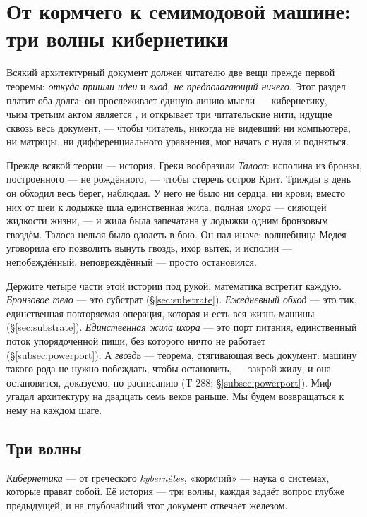 \section{От кормчего к семимодовой машине: три волны кибернетики}
\label{sec:genesis}

Всякий архитектурный документ должен читателю две вещи прежде первой теоремы:
\emph{откуда пришли идеи} и \emph{вход, не предполагающий ничего}. Этот раздел
платит оба долга: он прослеживает единую линию мысли --- кибернетику, --- чьим
третьим актом является \TALOS{}, и открывает три читательские нити, идущие
сквозь весь документ, --- чтобы читатель, никогда не видевший ни компьютера,
ни матрицы, ни дифференциального уравнения, мог начать с нуля и подняться.

\begin{mythbox}
Прежде всякой теории --- история. Греки вообразили \emph{Талоса}: исполина из
бронзы, построенного --- не рождённого, --- чтобы стеречь остров Крит. Трижды
в день он обходил весь берег, наблюдая. У него не было ни сердца, ни крови;
вместо них от шеи к лодыжке шла единственная жила, полная \emph{ихора} ---
сияющей жидкости жизни, --- и жила была запечатана у лодыжки одним бронзовым
гвоздём. Талоса нельзя было одолеть в бою. Он пал иначе: волшебница Медея
уговорила его позволить вынуть гвоздь, ихор вытек, и исполин ---
непобеждённый, неповреждённый --- просто остановился.

Держите четыре части этой истории под рукой; математика встретит каждую.
\emph{Бронзовое тело} --- это субстрат (\S\ref{sec:substrate}).
\emph{Ежедневный обход} --- это тик, единственная повторяемая операция,
которая и есть вся жизнь машины (\S\ref{sec:substrate}). \emph{Единственная
жила ихора} --- это порт питания, единственный поток упорядоченной пищи, без
которого ничто не работает (\S\ref{subsec:powerport}). А \emph{гвоздь} ---
теорема, стягивающая весь документ: машину такого рода не нужно побеждать,
чтобы остановить, --- закрой жилу, и она остановится, доказуемо, по расписанию
(T-288; \S\ref{subsec:powerport}). Миф угадал архитектуру на двадцать семь
веков раньше. Мы будем возвращаться к нему на каждом шаге.
\end{mythbox}

\subsection{Три волны}
\label{subsec:waves}

\emph{Кибернетика} --- от греческого \emph{kybern\'etes}, «кормчий» --- наука
о системах, которые правят собой. Её история --- три волны, каждая задаёт
вопрос глубже предыдущей, и на глубочайший этот документ отвечает железом.


